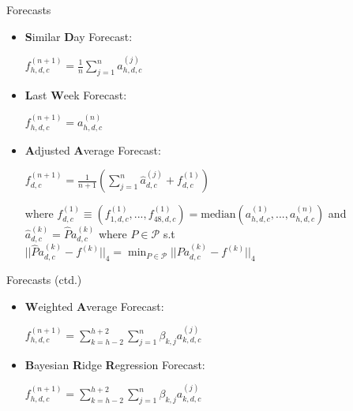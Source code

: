 \documentclass[notes]{beamer}
\begin{document}
\begin{frame}{Forecasts}
\begin{itemize}
\item \textbf{S}imilar \textbf{D}ay Forecast: 
\begin{center} $f_{h,d,c}^{(n+1)} =  \frac{1}{n} \displaystyle \sum_{j=1}^{n} a_{h,d,c}^{(j)}$ \end{center}
\pause
\item \textbf{L}ast \textbf{W}eek Forecast:
\begin{center} $f_{h,d,c}^{(n+1)} =  a_{h,d,c}^{(n)}$ \end{center}
\pause
\item \textbf{A}djusted \textbf{A}verage Forecast:

\begin{center} $ f^{(n+1)}_{d,c}  = \frac{1}{n+1}\left( \displaystyle \sum_{j=1}^n \hat{a}^{(j)}_{d,c} + f^{(1)}_{d,c}\right)$ \end{center}
where $f^{(1)}_{d,c} \equiv (f^{(1)}_{1,d,c}, ... , f^{(1)}_{48,d,c}) = \text{median}(a^{(1)}_{h,d,c}, ... , a^{(n)}_{h,d,c})$ and $\hat{a}_{d,c}^{(k)} = \hat{P} a_{d,c}^{(k)}$ where $P \in \mathscr{P}$ s.t $|| \hat{P} a_{d,c}^{(k)} - f^{(k)} ||_4 = \displaystyle \min_{P \in \mathscr{P}} || P a_{d,c}^{(k)} - f^{(k)} ||_4$
\end{itemize}

\end{frame}

\begin{frame}{Forecasts (ctd.)}
\begin{itemize}

\item \textbf{W}eighted \textbf{A}verage Forecast:
\begin{center} $f_{h,d,c}^{(n+1)} =  \displaystyle \sum_{k=h-2}^{h+2} \sum_{j=1}^{n} \beta_{k,j} a_{k,d,c}^{(j)}$ \end{center}
\pause

\item \textbf{B}ayesian \textbf{R}idge \textbf{R}egression Forecast:
\begin{center} $f_{h,d,c}^{(n+1)} =  \displaystyle \sum_{k=h-2}^{h+2} \sum_{j=1}^{n} \beta_{k,j} a_{k,d,c}^{(j)}$ \end{center}
\end{itemize}
\end{frame}
\end{document}
